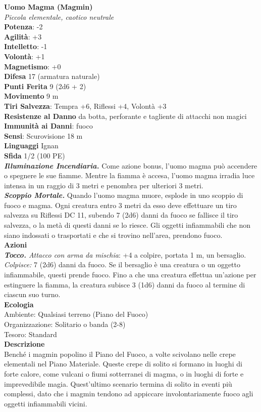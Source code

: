 \begin{multicols}{2}
\medskip\textbf{Uomo Magma (Magmin)}\\
\emph{Piccola elementale, caotico neutrale}\\
\textbf{Potenza}: -2\\
\textbf{Agilità}: +3\\
\textbf{Intelletto}: -1\\
\textbf{Volontà}: +1\\
\textbf{Magnetismo}: +0\\
\textbf{Difesa} 17 (armatura naturale)\\
\textbf{Punti Ferita} 9 (2d6 + 2)\\
\textbf{Movimento} 9 m\\
\textbf{Tiri Salvezza}: Tempra +6, Riflessi +4, Volontà +3\\
\textbf{Resistenze al Danno} da botta, perforante e tagliente di attacchi non magici\\
\textbf{Immunità ai Danni}: fuoco\\
\textbf{Sensi}: Scurovisione 18 m\\
\textbf{Linguaggi} Ignan\\
\textbf{Sfida} 1/2 (100 PE)\smallskip\\
\emph{\textbf{Illuminazione Incendiaria.}} Come azione bonus, l'uomo magma può accendere o spegnere le sue fiamme. Mentre la fiamma è accesa, l'uomo magma irradia luce intensa in un raggio di 3 metri e penombra per ulteriori 3 metri.\\
\emph{\textbf{Scoppio Mortale.}} Quando l'uomo magma muore, esplode in uno scoppio di fuoco e magma. Ogni creatura entro 3 metri da esso deve effettuare un tiro salvezza su Riflessi DC 11, subendo 7 (2d6) danni da fuoco se fallisce il tiro salvezza, o la metà di questi danni se lo riesce. Gli oggetti infiammabili che non siano indossati o trasportati e che si trovino nell'area, prendono fuoco.\\
\smallskip\textbf{Azioni}\\
\emph{\textbf{Tocco.} Attacco con arma da mischia}: +4 a colpire, portata 1 m, un bersaglio.\\
\emph{Colpisce:} 7 (2d6) danni da fuoco. Se il bersaglio è una creatura o un oggetto infiammabile, questi prende fuoco. Fino a che una creatura effettua un'azione per estinguere la fiamma, la creatura subisce 3 (1d6) danni da fuoco al termine di ciascun suo turno.\\
\textbf{Ecologia}\\
Ambiente: Qualsiasi terreno (Piano del Fuoco)\\
Organizzazione: Solitario o banda (2-8)\\
Tesoro: Standard\\
\textbf{Descrizione}\\
Benché i magmin popolino il Piano del Fuoco, a volte scivolano nelle crepe elementali nel Piano Materiale. Queste crepe di solito si formano in luoghi di forte calore, come vulcani o fiumi sotterranei di magma, o in luoghi di forte e imprevedibile magia. Quest'ultimo scenario termina di solito in eventi più complessi, dato che i magmin tendono ad appiccare involontariamente fuoco agli oggetti infiammabili vicini.\\


\end{multicols}
